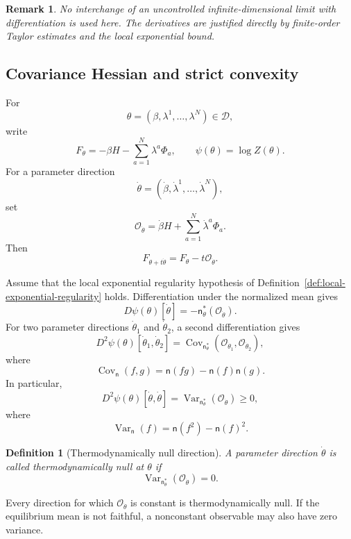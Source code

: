 \documentclass[10pt,a4paper]{amsart}
\newtheorem{Definition}[Theorem]{Definition}
\newtheorem{rem}[Theorem]{Remark}
\begin{document}
\begin{rem}
No interchange of an uncontrolled infinite-dimensional limit with
differentiation is used here. The derivatives are justified directly
by finite-order Taylor estimates and the local exponential bound.
\end{rem}

\subsection{Covariance Hessian and strict convexity}
\label{subsec:covariance-hessian}

For
\[
\theta=(\beta,\lambda^1,\ldots,\lambda^N)\in\mathcal D,
\]
write
\[
F_\theta
=
-\beta H-\sum_{a=1}^{N}\lambda^a\Phi_a,
\qquad
\psi(\theta)
=
\log Z(\theta).
\]
For a parameter direction
\[
\dot\theta
=
(\dot\beta,\dot\lambda^1,\ldots,\dot\lambda^N),
\]
set
\[
\mathcal O_{\dot\theta}
=
\dot\beta H+\sum_{a=1}^{N}\dot\lambda^a\Phi_a.
\]
Then
\[
F_{\theta+t\dot\theta}
=
F_\theta-t\mathcal O_{\dot\theta}.
\]

Assume that the local exponential regularity hypothesis of
Definition~\ref{def:local-exponential-regularity} holds. Differentiation
under the normalized mean gives
\[
D\psi(\theta)[\dot\theta]
=
-\mathsf n_\theta^*(\mathcal O_{\dot\theta}).
\]
For two parameter directions $\dot\theta_1$ and $\dot\theta_2$, a second
differentiation gives
\[
D^2\psi(\theta)
[\dot\theta_1,\dot\theta_2]
=
\operatorname{Cov}_{\mathsf n_\theta^*}
\left(
\mathcal O_{\dot\theta_1},
\mathcal O_{\dot\theta_2}
\right),
\]
where
\[
\operatorname{Cov}_{\mathsf n}(f,g)
=
\mathsf n(fg)-\mathsf n(f)\mathsf n(g).
\]
In particular,
\[
D^2\psi(\theta)[\dot\theta,\dot\theta]
=
\operatorname{Var}_{\mathsf n_\theta^*}
(\mathcal O_{\dot\theta})
\geq 0,
\]
where
\[
\operatorname{Var}_{\mathsf n}(f)
=
\mathsf n(f^2)-\mathsf n(f)^2.
\]

\begin{Definition}[Thermodynamically null direction]
\label{def:null-direction}
A parameter direction $\dot\theta$ is called
\emph{thermodynamically null at $\theta$} if
\[
\operatorname{Var}_{\mathsf n_\theta^*}
(\mathcal O_{\dot\theta})=0.
\]
\end{Definition}

Every direction for which $\mathcal O_{\dot\theta}$ is constant is
thermodynamically null. If the equilibrium mean is not faithful, a
nonconstant observable may also have zero variance.
\end{document}
